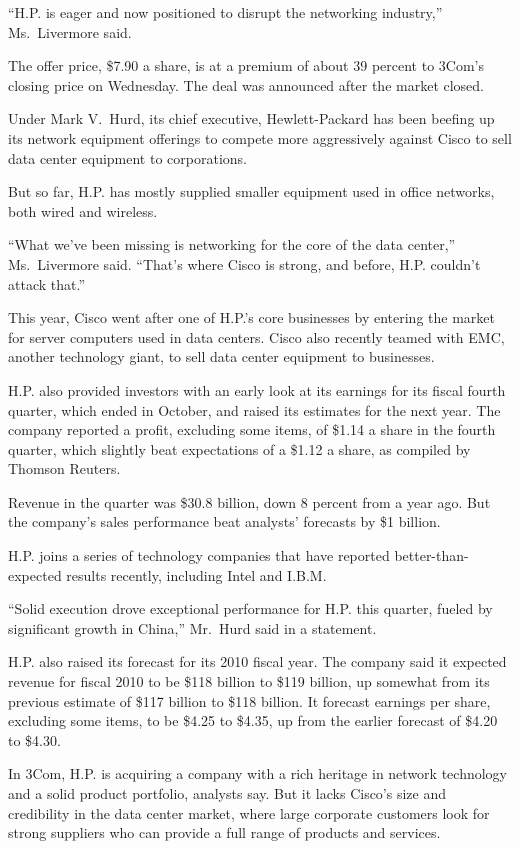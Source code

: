 ﻿\documentclass[12pt]{article}
\begin{document}
``H.P. is eager and now positioned to disrupt the networking industry,'' Ms.~Livermore said.

The offer price, \$7.90 a share, is at a premium of about 39 percent to 3Com's closing price on
Wednesday. The deal was announced after the market closed.

Under Mark V.~Hurd, its chief executive, Hewlett-Packard has been beefing up its network equipment
offerings to compete more aggressively against Cisco to sell data center equipment to corporations.

But so far, H.P. has mostly supplied smaller equipment used in office networks, both wired and
wireless.

``What we've been missing is networking for the core of the data center,'' Ms.~Livermore said.
``That's where Cisco is strong, and before, H.P. couldn't attack that.''

This year, Cisco went after one of H.P.'s core businesses by entering the market for server
computers used in data centers. Cisco also recently teamed with EMC, another technology giant, to
sell data center equipment to businesses.

H.P. also provided investors with an early look at its earnings for its fiscal fourth quarter, which
ended in October, and raised its estimates for the next year. The company reported a profit,
excluding some items, of \$1.14 a share in the fourth quarter, which slightly beat expectations of a
\$1.12 a share, as compiled by Thomson Reuters.

Revenue in the quarter was \$30.8 billion, down 8 percent from a year ago. But the company's sales
performance beat analysts' forecasts by \$1 billion.

H.P. joins a series of technology companies that have reported better-than-expected results
recently, including Intel and I.B.M.

``Solid execution drove exceptional performance for H.P. this quarter, fueled by significant growth
in China,'' Mr.~Hurd said in a statement.

H.P. also raised its forecast for its 2010 fiscal year. The company said it expected revenue for
fiscal 2010 to be \$118 billion to \$119 billion, up somewhat from its previous estimate of \$117
billion to \$118 billion. It forecast earnings per share, excluding some items, to be \$4.25 to
\$4.35, up from the earlier forecast of \$4.20 to \$4.30.

In 3Com, H.P. is acquiring a company with a rich heritage in network technology and a solid product
portfolio, analysts say. But it lacks Cisco's size and credibility in the data center market, where
large corporate customers look for strong suppliers who can provide a full range of products and
services.
\end{document}
